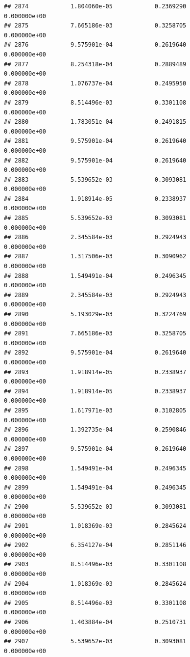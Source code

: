 \documentclass[
]{article}
\begin{document}
\begin{verbatim}
## 2874            1.804060e-05            0.2369290            0.000000e+00
## 2875            7.665186e-03            0.3258705            0.000000e+00
## 2876            9.575901e-04            0.2619640            0.000000e+00
## 2877            8.254318e-04            0.2889489            0.000000e+00
## 2878            1.076737e-04            0.2495950            0.000000e+00
## 2879            8.514496e-03            0.3301108            0.000000e+00
## 2880            1.783051e-04            0.2491815            0.000000e+00
## 2881            9.575901e-04            0.2619640            0.000000e+00
## 2882            9.575901e-04            0.2619640            0.000000e+00
## 2883            5.539652e-03            0.3093081            0.000000e+00
## 2884            1.918914e-05            0.2338937            0.000000e+00
## 2885            5.539652e-03            0.3093081            0.000000e+00
## 2886            2.345584e-03            0.2924943            0.000000e+00
## 2887            1.317506e-03            0.3090962            0.000000e+00
## 2888            1.549491e-04            0.2496345            0.000000e+00
## 2889            2.345584e-03            0.2924943            0.000000e+00
## 2890            5.193029e-03            0.3224769            0.000000e+00
## 2891            7.665186e-03            0.3258705            0.000000e+00
## 2892            9.575901e-04            0.2619640            0.000000e+00
## 2893            1.918914e-05            0.2338937            0.000000e+00
## 2894            1.918914e-05            0.2338937            0.000000e+00
## 2895            1.617971e-03            0.3102805            0.000000e+00
## 2896            1.392735e-04            0.2590846            0.000000e+00
## 2897            9.575901e-04            0.2619640            0.000000e+00
## 2898            1.549491e-04            0.2496345            0.000000e+00
## 2899            1.549491e-04            0.2496345            0.000000e+00
## 2900            5.539652e-03            0.3093081            0.000000e+00
## 2901            1.018369e-03            0.2845624            0.000000e+00
## 2902            6.354127e-04            0.2851146            0.000000e+00
## 2903            8.514496e-03            0.3301108            0.000000e+00
## 2904            1.018369e-03            0.2845624            0.000000e+00
## 2905            8.514496e-03            0.3301108            0.000000e+00
## 2906            1.403884e-04            0.2510731            0.000000e+00
## 2907            5.539652e-03            0.3093081            0.000000e+00

\end{verbatim}
\end{document}
